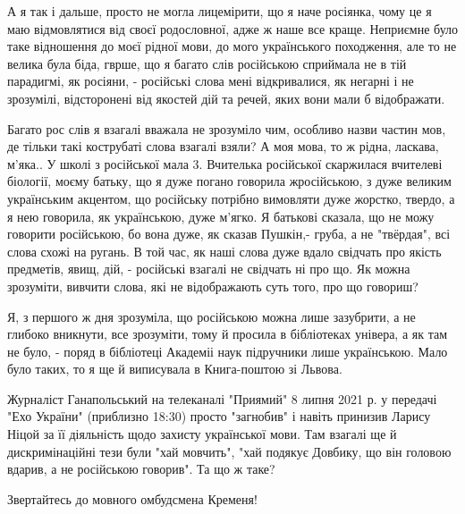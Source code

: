 \begin{itemize}
\begin{itemize}
А я так і дальше, просто не могла лицемірити, що я наче росіянка, чому це я маю
відмовлятися від своєї родословної, адже ж наше все краще. Неприємне було таке
відношення до моєї рідної мови, до мого українського походження, але то не
велика була біда, гврше, що я багато слів російською сприймала не в тій
парадигмі, як росіяни, - російські слова мені відкривалися, як негарні і не
зрозумілі, відсторонені від якостей дій та речей, яких вони мали б відображати. 

Багато рос слів я взагалі вважала не зрозуміло чим, особливо назви частин мов,
де тільки такі кострубаті слова взагалі взяли? А моя мова, то ж рідна, ласкава,
м'яка.. У школі з російської мала 3. Вчителька російської скаржилася вчителеві
біології, моєму батьку, що я дуже погано говорила жросійською, з дуже великим
українським акцентом, що російську потрібно вимовляти дуже жорстко, твердо, а я
нею говорила, як українською, дуже м'ягко. Я батькові сказала, що не можу
говорити російською, бо вона дуже, як сказав Пушкін,- груба, а не "твёрдая",
всі слова схожі на ругань. В той час, як наші слова дуже вдало свідчать про
якість предметів, явищ, дій, - російські взагалі не свідчать ні про що. Як
можна зрозуміти, вивчити слова, які не відображають суть того, про що говориш? 

Я, з першого ж дня зрозуміла, що російською можна лише зазубрити, а не глибоко
вникнути, все зрозуміти, тому й просила в бібліотеках універа, а як там не
було, - поряд в бібліотеці Академіі наук підручники лише українською. Мало було
таких, то я ще й виписувала в Книга-поштою зі Львова.

\end{itemize}

 

Журналіст Ганапольський на телеканалі "Приямий" 8 липня 2021 р. у передачі "Ехо
України" (приблизно 18:30) просто "загнобив" і навіть принизив Ларису Ніцой за
її діяльність щодо захисту української мови. Там взагалі ще й дискримінаційні
тези були "хай мовчить", "хай подякує Довбику, що він головою вдарив, а не
російською говорив". Та що ж таке?

Звертайтесь до мовного омбудсмена Кременя!

\begin{itemize}
 

\end{itemize}
\end{itemize}
